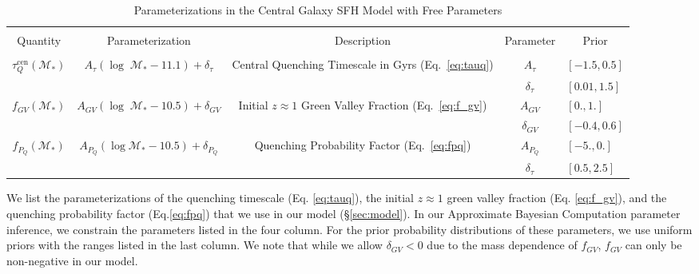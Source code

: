 \documentclass[iop,apj,tighten,twocolappendix,numberedappendix]{emulateapj}
\begin{document}
\begin{table}
\caption{Parameterizations in the Central Galaxy SFH Model with Free Parameters}
\begin{center}
\begin{tabular}{ccccc} \toprule
\multicolumn{5}{c}{} \\[-7pt]
\multicolumn{1}{c}{Quantity} & \multicolumn{1}{c}{Parameterization} &
\multicolumn{1}{c}{Description} & \multicolumn{1}{c}{Parameter} &
\multicolumn{1}{c}{Prior} \\
\hline
\multicolumn{5}{c}{} \\[-5pt]
\multicolumn{1}{c}{$\tau_Q^\mathrm{cen}(\mathcal{M}_*)$} & 
\multicolumn{1}{c}{$A_\tau (\log\;\mathcal{M}_* - 11.1) + \delta_\tau$} & 
\multicolumn{1}{c}{Central Quenching Timescale in Gyrs (Eq.~\ref{eq:tauq})} & 
\multicolumn{1}{c}{$A_\tau$} & 
\multicolumn{1}{l}{$[-1.5, 0.5]$} \\
\multicolumn{1}{c}{} & \multicolumn{1}{c}{} & \multicolumn{1}{c}{} & 
\multicolumn{1}{c}{$\delta_\tau$} & \multicolumn{1}{l}{$[0.01, 1.5]$} \\[3pt]
\multicolumn{1}{c}{$f_{GV}(\mathcal{M}_*)$} & 
\multicolumn{1}{c}{$A_{GV} (\log\;\mathcal{M}_* - 10.5) + \delta_{GV}$} & 
\multicolumn{1}{c}{Initial $z \approx 1$ Green Valley Fraction (Eq.~\ref{eq:f_gv})} & 
\multicolumn{1}{c}{$A_{GV}$} & 
\multicolumn{1}{l}{$[0., 1.]$} \\
\multicolumn{1}{c}{} & \multicolumn{1}{c}{} & \multicolumn{1}{c}{} & 
\multicolumn{1}{c}{$\delta_{GV}$} & \multicolumn{1}{l}{$[-0.4, 0.6]$} \\[3pt]
\multicolumn{1}{c}{$f_{P_Q}(\mathcal{M}_*)$} & 
\multicolumn{1}{c}{$A_{P_Q} (\log\mathcal{M}_* - 10.5) + \delta_{P_Q}$} & 
\multicolumn{1}{c}{Quenching Probability Factor (Eq.~\ref{eq:fpq})} & 
\multicolumn{1}{c}{$A_{P_Q}$} & 
\multicolumn{1}{l}{$[-5., 0.]$} \\
\multicolumn{1}{c}{} & \multicolumn{1}{c}{} & \multicolumn{1}{c}{} & 
\multicolumn{1}{c}{$\delta_\tau$} & \multicolumn{1}{l}{$[0.5, 2.5]$} \\[3pt]
\hline
\end{tabular} \label{tab:free_params}
\end{center}
We list the parameterizations of the quenching timescale (Eq. \ref{eq:tauq}), 
the initial $z \approx 1$ green valley fraction (Eq. \ref{eq:f_gv}), 
and the quenching probability factor (Eq.\ref{eq:fpq}) that we use in our 
model (\S\ref{sec:model}). In our Approximate Bayesian Computation 
parameter inference, we constrain the parameters listed in the four 
column. For the prior probability distributions of
these parameters, we use uniform priors with the ranges listed in the 
last column. We note that while we allow $\delta_{GV} < 0$ due to the mass 
dependence of $f_{GV}$, $f_{GV}$ can only be non-negative in our model.
\bigskip
\end{table}
\end{document}
